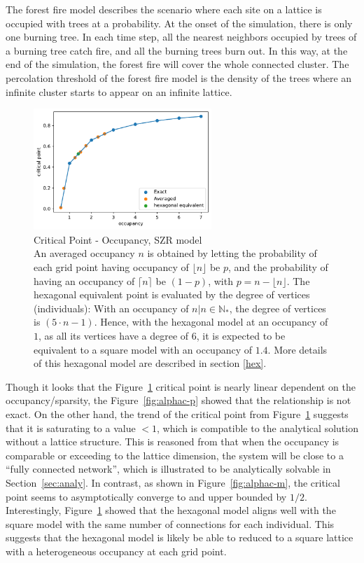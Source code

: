 \documentclass[11pt]{article}
\begin{document}
The forest fire model describes the scenario where each site on a lattice is occupied with trees at a probability. At the onset of the simulation, there is only one burning tree. In each time step, all the nearest neighbors occupied by trees of a burning tree catch fire, and all the burning trees burn out. In this way, at the end of the simulation, the forest fire will cover the whole connected cluster. The percolation threshold of the forest fire model is the density of the trees where an infinite cluster starts to appear on an infinite lattice.\\

\begin{figure}[H]
    \centering
    \includegraphics[width=0.6\textwidth]{fig/Critical_Occupancy_SZR.pdf}
    \caption{Critical Point - Occupancy, SZR model\\
        An averaged occupancy $n$ is obtained by letting the probability of each grid point having occupancy of $\lfloor n\rfloor$ be $p$, and the probability of having an occupancy of $\lceil n\rceil$ be $(1-p)$, with $p=n-\lfloor n\rfloor$. The hexagonal equivalent point is evaluated by the degree of vertices (individuals): With an occupancy of $n|n\in\mathbb{N}_*$, the degree of vertices is $(5\cdot n-1)$. Hence, with the hexagonal model at an occupancy of $1$, as all its vertices have a degree of $6$, it is expected to be equivalent to a square model with an occupancy of $1.4$. More details of this hexagonal model are described in section \ref{hex}.
        \label{fig:alphac-o}
    }
\end{figure}

Though it looks that the Figure~\ref{fig:alphac-o} critical point is nearly linear dependent on the occupancy/sparsity, the Figure~\ref{fig:alphac-p} showed that the relationship is not exact. On the other hand, the trend of the critical point from Figure~\ref{fig:alphac-o} suggests that it is saturating to a value $<1$, which is compatible to the analytical solution without a lattice structure. This is reasoned from that when the occupancy is comparable or exceeding to the lattice dimension, the system will be close to a ``fully connected network'', which is illustrated to be analytically solvable in Section~\ref{sec:analy}. In contrast, as shown in Figure~\ref{fig:alphac-m}, the critical point seems to asymptotically converge to and upper bounded by $1/2$.
Interestingly, Figure~\ref{fig:alphac-o} showed that the hexagonal model aligns well with the square model with the same number of connections for each individual. This suggests that the hexagonal model is likely be able to reduced to a square lattice with a heterogeneous occupancy at each grid point.
\end{document}
